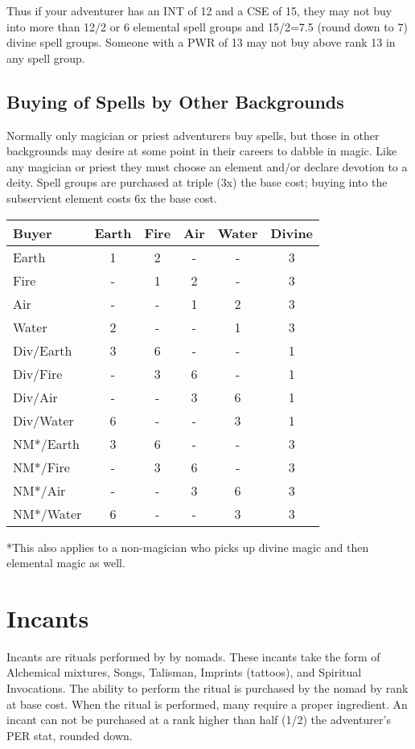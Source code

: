 Thus if your adventurer has an INT of 12 and a CSE of 15, they may not buy into more than 12/2 or 6 elemental spell groups and 15/2=7.5 (round down to 7) divine spell groups. Someone with a PWR of 13 may not buy above rank 13 in any spell group. 
\subsection{Buying of Spells by Other Backgrounds}
Normally only magician or priest adventurers buy spells, but those in other backgrounds may desire at some point in their careers to dabble in magic. Like any magician or priest they must choose an element and/or declare devotion to a deity. Spell groups are purchased at triple (3x) the base cost; buying into the subservient element costs 6x the base cost.

\begin{normboxc}

\small
\begin{tabular}{@{}l c c c c c}
\textbf{Buyer} & \textbf{Earth}  & \textbf{Fire} & \textbf{Air} & \textbf{Water}  & \textbf{Divine}\\
\midrule
Earth & 1 & 2 & - & - & 3\\
Fire & - & 1 & 2 & - & 3\\
Air & - & - & 1 & 2 & 3\\
Water & 2 & - & - & 1 & 3\\
Div/Earth & 3 & 6 & - & - & 1\\
Div/Fire & - & 3 & 6 & - & 1\\
Div/Air & - & - & 3 & 6 & 1\\
Div/Water & 6 & - & - & 3 & 1\\
NM*/Earth & 3 & 6 & - & - & 3\\
NM*/Fire & - & 3 & 6 & - & 3\\
NM*/Air & - & - & 3 & 6 & 3\\
NM*/Water & 6 & - & - & 3 & 3\\
\end{tabular}
\end{normboxc}

*This also applies to a non-magician who picks up divine magic and then elemental magic as well.
\section{Incants}
Incants are rituals performed by by nomads. These
incants take the form of Alchemical mixtures, Songs, Talisman, Imprints (tattoos), and Spiritual Invocations. The ability to perform the ritual is purchased by the nomad by rank at base cost. When the ritual is performed, many require a proper ingredient. An incant can not be purchased at a rank higher than half (1/2) the adventurer's PER stat, rounded down.
